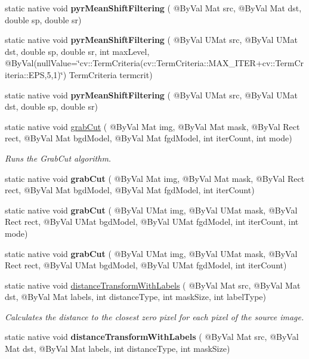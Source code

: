 \begin{DoxyCompactItemize}
\item 
static native void {\bfseries pyr\+Mean\+Shift\+Filtering} ( @By\+Val Mat src, @By\+Val Mat dst, double sp, double sr)
\item 
static native void {\bfseries pyr\+Mean\+Shift\+Filtering} ( @By\+Val U\+Mat src, @By\+Val U\+Mat dst, double sp, double sr, int max\+Level, @By\+Val(null\+Value=\char`\"{}cv\+::\+Term\+Criteria(cv\+::\+Term\+Criteria\+::\+M\+A\+X\+\_\+\+I\+T\+ER+cv\+::\+Term\+Criteria\+::\+E\+PS,5,1)\char`\"{}) Term\+Criteria termcrit)
\item 
static native void {\bfseries pyr\+Mean\+Shift\+Filtering} ( @By\+Val U\+Mat src, @By\+Val U\+Mat dst, double sp, double sr)
\item 
static native void \hyperlink{group__imgproc__misc_gaa33f53e9a934a40de2e80d2cec508ba2}{grab\+Cut} ( @By\+Val Mat img, @By\+Val Mat mask, @By\+Val Rect rect, @By\+Val Mat bgd\+Model, @By\+Val Mat fgd\+Model, int iter\+Count, int mode)
\begin{DoxyCompactList}\small\item\em Runs the Grab\+Cut algorithm. \end{DoxyCompactList}\item 
static native void {\bfseries grab\+Cut} ( @By\+Val Mat img, @By\+Val Mat mask, @By\+Val Rect rect, @By\+Val Mat bgd\+Model, @By\+Val Mat fgd\+Model, int iter\+Count)
\item 
static native void {\bfseries grab\+Cut} ( @By\+Val U\+Mat img, @By\+Val U\+Mat mask, @By\+Val Rect rect, @By\+Val U\+Mat bgd\+Model, @By\+Val U\+Mat fgd\+Model, int iter\+Count, int mode)
\item 
static native void {\bfseries grab\+Cut} ( @By\+Val U\+Mat img, @By\+Val U\+Mat mask, @By\+Val Rect rect, @By\+Val U\+Mat bgd\+Model, @By\+Val U\+Mat fgd\+Model, int iter\+Count)
\item 
static native void \hyperlink{group__imgproc__misc_gaaaf8e9c28cfa3aa0fba026897d9ad6d8}{distance\+Transform\+With\+Labels} ( @By\+Val Mat src, @By\+Val Mat dst, @By\+Val Mat labels, int distance\+Type, int mask\+Size, int label\+Type)
\begin{DoxyCompactList}\small\item\em Calculates the distance to the closest zero pixel for each pixel of the source image. \end{DoxyCompactList}\item 
static native void {\bfseries distance\+Transform\+With\+Labels} ( @By\+Val Mat src, @By\+Val Mat dst, @By\+Val Mat labels, int distance\+Type, int mask\+Size)

\end{DoxyCompactItemize}
